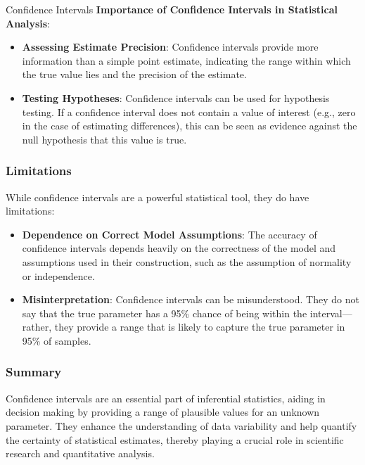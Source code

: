 \begin{notes}{Confidence Intervals}
    \textbf{Importance of Confidence Intervals in Statistical Analysis}:
    \begin{itemize}
        \item \textbf{Assessing Estimate Precision}: Confidence intervals provide more information than a simple point estimate, indicating the range within which the true value lies and the precision of the estimate.
        \item \textbf{Testing Hypotheses}: Confidence intervals can be used for hypothesis testing. If a confidence interval does not contain a value of interest (e.g., zero in the case of estimating 
        differences), this can be seen as evidence against the null hypothesis that this value is true.
    \end{itemize}
    
    \subsubsection*{Limitations}
    
    While confidence intervals are a powerful statistical tool, they do have limitations:
    \begin{itemize}
        \item \textbf{Dependence on Correct Model Assumptions}: The accuracy of confidence intervals depends heavily on the correctness of the model and assumptions used in their construction, such 
        as the assumption of normality or independence.
        \item \textbf{Misinterpretation}: Confidence intervals can be misunderstood. They do not say that the true parameter has a 95\% chance of being within the interval—rather, they provide a 
        range that is likely to capture the true parameter in 95\% of samples.
    \end{itemize}
    
    \subsubsection*{Summary}
    
    Confidence intervals are an essential part of inferential statistics, aiding in decision making by providing a range of plausible values for an unknown parameter. They enhance the understanding 
    of data variability and help quantify the certainty of statistical estimates, thereby playing a crucial role in scientific research and quantitative analysis.    
\end{notes}